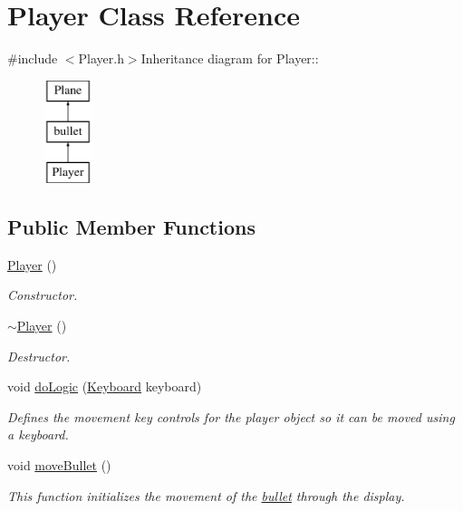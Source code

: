 \hypertarget{classPlayer}{
\section{Player Class Reference}
\label{classPlayer}
}


{\ttfamily \#include $<$Player.h$>$}Inheritance diagram for Player::\begin{figure}[H]
\begin{center}
\leavevmode
\includegraphics[height=3cm]{classPlayer}
\end{center}
\end{figure}
\subsection*{Public Member Functions}
\begin{DoxyCompactItemize}
\item 
\hyperlink{classPlayer_affe0cc3cb714f6deb4e62f0c0d3f1fd8}{Player} ()
\begin{DoxyCompactList}\small\item\em Constructor. \item\end{DoxyCompactList}\item 
\hyperlink{classPlayer_a749d2c00e1fe0f5c2746f7505a58c062}{$\sim$Player} ()
\begin{DoxyCompactList}\small\item\em Destructor. \item\end{DoxyCompactList}\item 
void \hyperlink{classPlayer_addf356ccfe6223db41eb4a06d5661a60}{doLogic} (\hyperlink{classKeyboard}{Keyboard} keyboard)
\begin{DoxyCompactList}\small\item\em Defines the movement key controls for the player object so it can be moved using a keyboard. \item\end{DoxyCompactList}\item 
void \hyperlink{classPlayer_a4c994edd3d4c3b3378501353d73e30cb}{moveBullet} ()
\begin{DoxyCompactList}\small\item\em This function initializes the movement of the \hyperlink{classbullet}{bullet} through the display. \item\end{DoxyCompactList}\end{DoxyCompactItemize}
